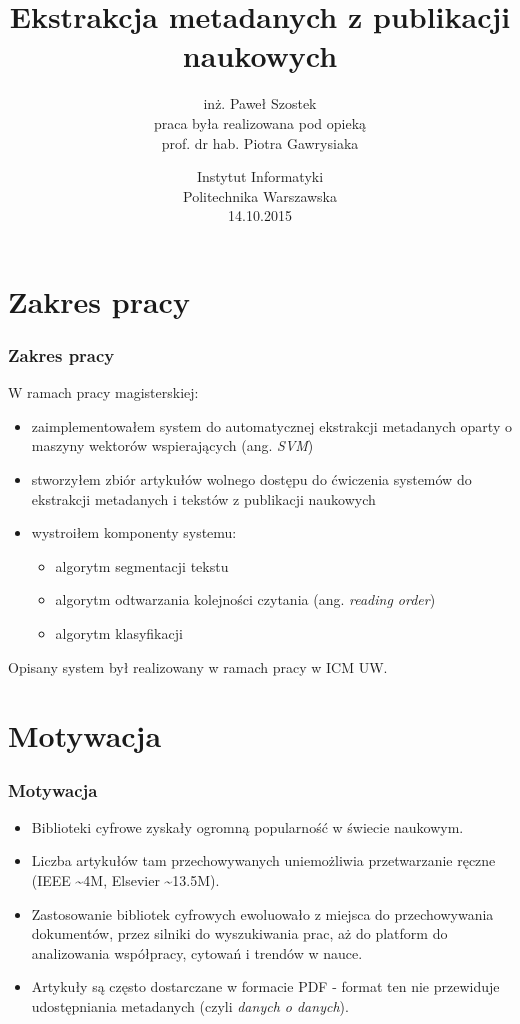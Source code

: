 \documentclass[11pt,t]{beamer}
\begin{document}
\title{Ekstrakcja metadanych z publikacji naukowych}
\author{inż. Paweł Szostek \\\vspace{1cm}
praca była realizowana pod opieką \\ prof. dr hab. Piotra Gawrysiaka}
\date{Instytut Informatyki \\
Politechnika Warszawska \\
14.10.2015}


\frame{\titlepage}
\section{Zakres pracy}
\begin{frame}
	\frametitle{Zakres pracy}
	W ramach pracy magisterskiej:
	\begin{itemize}
		\item zaimplementowałem system do automatycznej ekstrakcji metadanych oparty o maszyny wektorów wspierających (ang. \textit{SVM})
		\item stworzyłem zbiór artykułów wolnego dostępu do ćwiczenia systemów do ekstrakcji metadanych i tekstów z publikacji naukowych
		\item wystroiłem komponenty systemu:
		\begin{itemize}
			\item algorytm segmentacji tekstu
			\item algorytm odtwarzania kolejności czytania (ang. \textit{reading order})
			\item algorytm klasyfikacji
		\end{itemize}
	\end{itemize}
	Opisany system był realizowany w ramach pracy w ICM UW.
\end{frame}
\section{Motywacja}
\begin{frame}
	\frametitle{Motywacja}
	\begin{itemize}
		\item<1-> Biblioteki cyfrowe zyskały ogromną popularność w świecie naukowym.
		\item<2-> Liczba artykułów tam przechowywanych uniemożliwia przetwarzanie ręczne (IEEE \textasciitilde 4M, Elsevier \textasciitilde 13.5M).
		\item<3-> Zastosowanie bibliotek cyfrowych ewoluowało z miejsca do przechowywania dokumentów, przez silniki do wyszukiwania prac, aż do platform do analizowania współpracy, cytowań i trendów w nauce.
		\item<4-> Artykuły są często dostarczane w formacie PDF - format ten nie przewiduje udostępniania metadanych (czyli \textit{danych o danych}).
	\end{itemize}
\end{frame}
\end{document}
